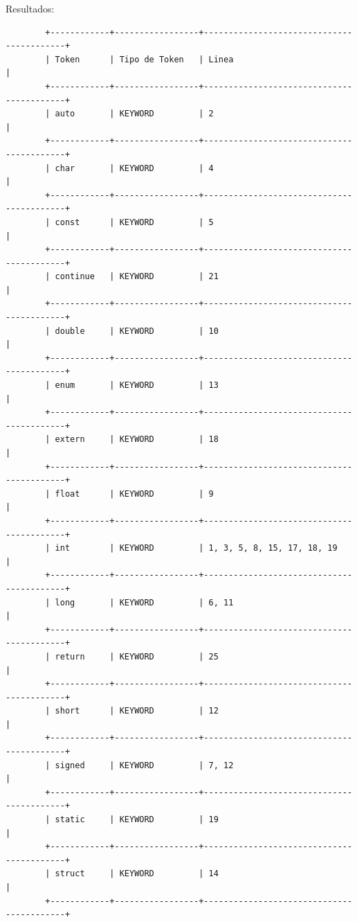 \documentclass[a4paper,12pt]{article}
\begin{document}
\begin{flushleft}
	Resultados:
	\begin{verbatim}
		+------------+-----------------+------------------------------------------+
		| Token      | Tipo de Token   | Linea                                    |
		+------------+-----------------+------------------------------------------+
		| auto       | KEYWORD         | 2                                        |
		+------------+-----------------+------------------------------------------+
		| char       | KEYWORD         | 4                                        |
		+------------+-----------------+------------------------------------------+
		| const      | KEYWORD         | 5                                        |
		+------------+-----------------+------------------------------------------+
		| continue   | KEYWORD         | 21                                       |
		+------------+-----------------+------------------------------------------+
		| double     | KEYWORD         | 10                                       |
		+------------+-----------------+------------------------------------------+
		| enum       | KEYWORD         | 13                                       |
		+------------+-----------------+------------------------------------------+
		| extern     | KEYWORD         | 18                                       |
		+------------+-----------------+------------------------------------------+
		| float      | KEYWORD         | 9                                        |
		+------------+-----------------+------------------------------------------+
		| int        | KEYWORD         | 1, 3, 5, 8, 15, 17, 18, 19               |
		+------------+-----------------+------------------------------------------+
		| long       | KEYWORD         | 6, 11                                    |
		+------------+-----------------+------------------------------------------+
		| return     | KEYWORD         | 25                                       |
		+------------+-----------------+------------------------------------------+
		| short      | KEYWORD         | 12                                       |
		+------------+-----------------+------------------------------------------+
		| signed     | KEYWORD         | 7, 12                                    |
		+------------+-----------------+------------------------------------------+
		| static     | KEYWORD         | 19                                       |
		+------------+-----------------+------------------------------------------+
		| struct     | KEYWORD         | 14                                       |
		+------------+-----------------+------------------------------------------+

\end{verbatim}
\end{flushleft}
\end{document}
